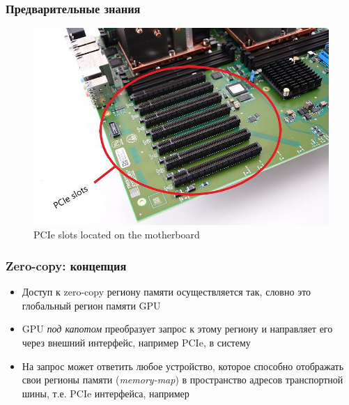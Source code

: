 \documentclass[xcolor=table,english]{beamer}
\begin{document}
\begin{frame}[fragile] \frametitle{Предварительные знания}
    \begin{center}
    \begin{minipage}[m]{0.75\linewidth}
        \begin{figure}
            \centering
            \includegraphics[width=\textwidth]{figures/pcie.jpg}
            \caption{PCIe slots located on the motherboard}
            \label{fig:pcie}
        \end{figure}
    \end{minipage}\hfill
    \end{center}
\end{frame}

\begin{frame}[fragile] \frametitle{Zero-copy: концепция}
    \begin{itemize}
        \item Доступ к zero-copy региону памяти осуществляется так, словно это глобальный регион памяти GPU
        \item GPU \textit{под капотом} преобразует запрос к этому региону и направляет его через внешний интерфейс, например PCIe, в систему
        \item На запрос может ответить любое устройство, которое способно отображать свои регионы памяти (\textit{memory-map}) в пространство адресов транспортной шины, т.е. PCIe интерфейса, например
    \end{itemize}
\end{frame}
\end{document}
